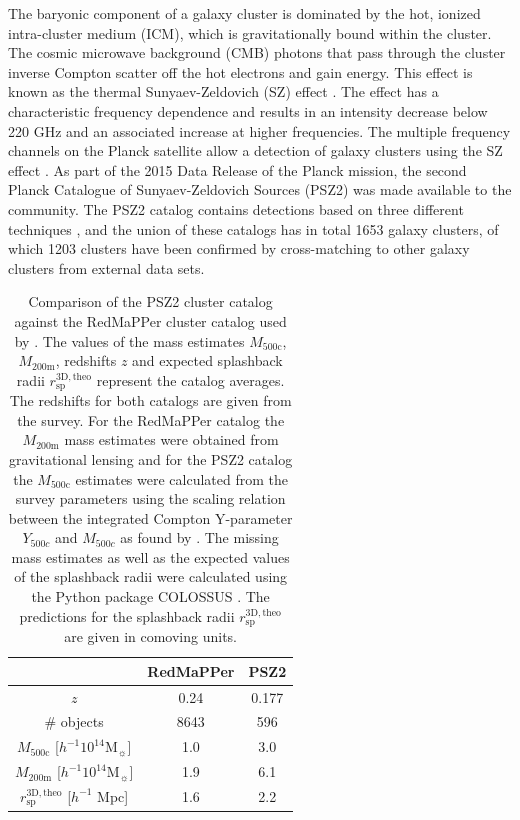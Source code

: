 \documentclass[iop, apjl, twocolappendix, numberedappendix]{emulateapj}
\begin{document}
The baryonic component of a galaxy cluster is dominated by the hot,
ionized  intra-cluster medium (ICM), which is gravitationally bound
within the cluster. The cosmic microwave background (CMB) photons
that pass through the cluster inverse Compton scatter off the hot
electrons and gain energy. This effect is known as the thermal
Sunyaev-Zeldovich (SZ) effect
\citep{sunyaev1970small,sunyaev1980velocity}. The effect has a
characteristic frequency dependence and results in an intensity
decrease below 220 GHz and an associated increase at higher
frequencies. The multiple frequency channels on the Planck satellite
allow a detection of galaxy clusters using the SZ effect
\citep{collaboration2016planck}. As part of the 2015 Data Release of
the Planck mission, the second Planck Catalogue of Sunyaev-Zeldovich
Sources (PSZ2) was made available to the community. The PSZ2 catalog
contains detections based on  three different techniques
\citep{ade2016planck}, and the union of these catalogs has in total
1653 galaxy clusters, of which 1203 clusters have been confirmed by
cross-matching to other galaxy clusters from external data sets.
\begin{table}
    \centering
    \caption{Comparison of the PSZ2 cluster catalog
    against the RedMaPPer cluster catalog used by
\citet{more2016detection}. The values of the mass estimates
$M_{\mathrm{500c}}$, $M_{\mathrm{200m}}$, redshifts $z$ and expected
splashback radii $r^{\mathrm{3D,theo}}_{\mathrm{sp}}$ represent the
catalog averages. The redshifts for both catalogs are given from the
survey. For the RedMaPPer catalog the $M_{\mathrm{200m}}$ mass
estimates were obtained from gravitational lensing and for the PSZ2
catalog the $M_{\mathrm{500c}}$ estimates were calculated from the
survey parameters using the scaling relation between the integrated
Compton Y-parameter $Y_{500c}$ and $M_{500c}$ as found by
\citet{ade2014planck}. The missing mass estimates as well as the
expected values of the splashback radii were calculated using the
Python package COLOSSUS \citep{diemer2017colossus}. The predictions
for the splashback radii $r^{\mathrm{3D,theo}}_{\mathrm{sp}}$ are
given in comoving units.}
    \label{tab:cluster_catalogs}
    \begin{tabular}{ccc}
    \hline
    & RedMaPPer & PSZ2 \\
    \hline
    $z$ & 0.24 & 0.177 \\
    \hline
    \# objects & 8643 & 596\\
    \hline
    $M_{\mathrm{500c}}$ [$h^{-1}10^{14} $M$_{\sun}$] & 1.0 & 3.0 \\
    \hline
    $M_{\mathrm{200m}}$ [$h^{-1}10^{14} $M$_{\sun}$] & 1.9 & 6.1\\
    \hline
    $r^{\mathrm{3D,theo}}_{\mathrm{sp}}$ [$h^{-1}$ Mpc] & 1.6 & 2.2 \\
    \hline
    \end{tabular}
\end{table}
\end{document}
